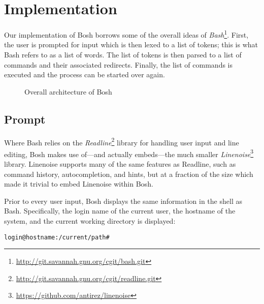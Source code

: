 \section{Implementation}
\label{sec:implementation}

Our implementation of Bosh borrows some of the overall ideas of \textit{Bash}\footnote{\url{http://git.savannah.gnu.org/cgit/bash.git}}. First, the user is prompted for input which is then lexed to a list of tokens; this is what Bash refers to as a list of words. The list of tokens is then parsed to a list of commands and their associated redirects. Finally, the list of commands is executed and the process can be started over again.

\begin{figure}
  \centering

  \caption{Overall architecture of Bosh}
  \label{fig:architecture}
\end{figure}

\subsection{Prompt}

Where Bash relies on the \textit{Readline}\footnote{\url{http://git.savannah.gnu.org/cgit/readline.git}} library for handling user input and line editing, Bosh makes use of---and actually embeds---the much smaller \textit{Linenoise}\footnote{\url{https://github.com/antirez/linenoise}} library. Linenoise supports many of the same features as Readline, such as command history, autocompletion, and hints, but at a fraction of the size which made it trivial to embed Linenoise within Bosh.

Prior to every user input, Bosh displays the same information in the shell as Bash. Specifically, the login name of the current user, the hostname of the system, and the current working directory is displayed:

\begin{lstlisting}
login@hostname:/current/path#
\end{lstlisting}

